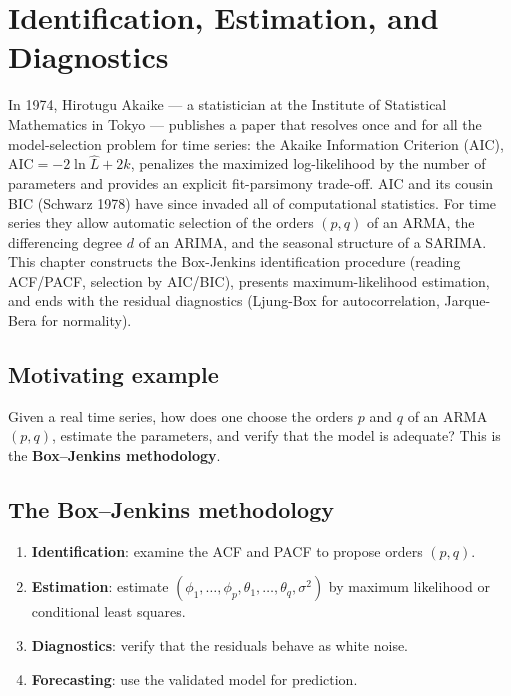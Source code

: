 \chapter{Identification, Estimation, and Diagnostics}
\label{ch:identification}

In 1974, Hirotugu Akaike --- a statistician at the Institute of Statistical Mathematics in Tokyo --- publishes a paper that resolves once and for all the model-selection problem for time series: the Akaike Information Criterion (AIC), $\mathrm{AIC} = -2 \ln \hat L + 2k$, penalizes the maximized log-likelihood by the number of parameters and provides an explicit fit-parsimony trade-off. AIC and its cousin BIC (Schwarz 1978) have since invaded all of computational statistics. For time series they allow automatic selection of the orders $(p,q)$ of an ARMA, the differencing degree $d$ of an ARIMA, and the seasonal structure of a SARIMA. This chapter constructs the Box-Jenkins identification procedure (reading ACF/PACF, selection by AIC/BIC), presents maximum-likelihood estimation, and ends with the residual diagnostics (Ljung-Box for autocorrelation, Jarque-Bera for normality).

\section{Motivating example}
Given a real time series, how does one choose the orders $p$ and $q$ of an ARMA$(p,q)$, estimate the parameters, and verify that the model is adequate? This is the \textbf{Box--Jenkins methodology}.

\section{The Box--Jenkins methodology}

\begin{method}
\begin{enumerate}
\item \textbf{Identification}: examine the ACF and PACF to propose orders $(p,q)$.
\item \textbf{Estimation}: estimate $(\phi_1,\ldots,\phi_p,\theta_1,\ldots,\theta_q,\sigma^2)$ by maximum likelihood or conditional least squares.
\item \textbf{Diagnostics}: verify that the residuals behave as white noise.
\item \textbf{Forecasting}: use the validated model for prediction.
\end{enumerate}
\end{method}

